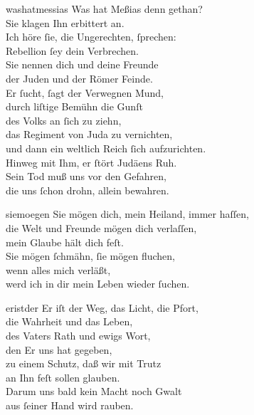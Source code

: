 \documentclass[tocstyle=ref-genre]{ees}
\begin{document}
{  \begin{movement}{washatmessias}
    \voice[Tenore]
    Was hat Meßias denn gethan?\\
    Sie klagen Ihn erbittert an.\\
    Ich höre ſie, die Ungerechten, ſprechen:\\
    Rebellion ſey dein Verbrechen.\\
    Sie nennen dich und deine Freunde\\
    der Juden und der Römer Feinde.\\
    Er ſucht, ſagt der Verwegnen Mund,\\
    durch liſtige Bemühn die Gunſt\\
    des Volks an ſich zu ziehn,\\
    das Regiment von Juda zu vernichten,\\
    und dann ein weltlich Reich ſich aufzurichten.\\
    Hinweg mit Ihm, er ſtört Judäens Ruh.\\
    Sein Tod muß uns vor den Gefahren,\\
    die uns ſchon drohn, allein bewahren.
  \end{movement}
  \clearpage
  \begin{movement}{siemoegen}
    \voice[Tenore]
    Sie mögen dich, mein Heiland, immer haſſen,\\
    die Welt und Freunde mögen dich verlaſſen,\\
    mein Glaube hält dich feſt.\\[1ex]
    Sie mögen ſchmähn, ſie mögen fluchen,\\
    wenn alles mich verläßt,\\
    werd ich in dir mein Leben wieder ſuchen.
  \end{movement}

  \begin{movement}{eristder}
    \voice[Coro]
    Er iſt der Weg, das Licht, die Pfort,\\
    die Wahrheit und das Leben,\\
    des Vaters Rath und ewigs Wort,\\
    den Er uns hat gegeben,\\
    zu einem Schutz, daß wir mit Trutz\\
    an Ihn feſt sollen glauben.\\
    Darum uns bald kein Macht noch Gwalt\\
    aus ſeiner Hand wird rauben.
  \end{movement}

}
\end{document}
